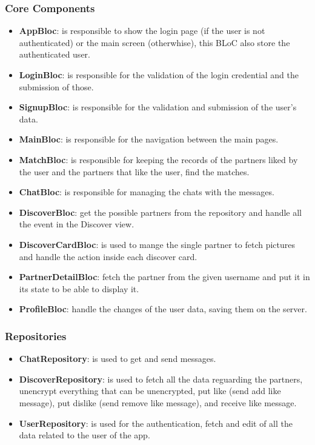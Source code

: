 \documentclass{article}
\begin{document}
\subsubsection{Core Components}
\begin{itemize}
	\item \textbf{AppBloc}: is responsible to show the login page (if the user is not authenticated) or the main screen (otherwhise), this BLoC also store the authenticated user.
	\item \textbf{LoginBloc}: is responsible for the validation of the login credential and the submission of those.
	\item \textbf{SignupBloc}: is responsible for the validation and submission of the user's data.
	\item \textbf{MainBloc}: is responsible for the navigation between the main pages.
	\item \textbf{MatchBloc}: is responsible for keeping the records of the partners liked by the user and the partners that like the user, find the matches.
	\item \textbf{ChatBloc}: is responsible for managing the chats with the messages.
	\item \textbf{DiscoverBloc}: get the possible partners from the repository and handle all the event in the Discover view.
    \item \textbf{DiscoverCardBloc}: is used to mange the single partner to fetch pictures and handle the action inside each discover card.
    \item \textbf{PartnerDetailBloc}: fetch the partner from the given username and put it in its state to be able to display it.
    \item \textbf{ProfileBloc}: handle the changes of the user data, saving them on the server.
\end{itemize}

\subsubsection{Repositories}
\label{sec:repositories}

\begin{itemize}
	\item \textbf{ChatRepository}: is used to get and send messages.
	\item \textbf{DiscoverRepository}: is used to fetch all the data reguarding the partners, unencrypt everything that can be unencrypted, put like (send add like message), put dislike (send remove like message), and receive like message.
	\item \textbf{UserRepository}: is used for the authentication, fetch and edit of all the data related to the user of the app.
\end{itemize}
\end{document}
